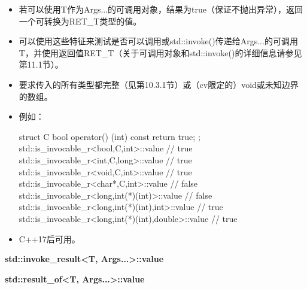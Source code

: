 \begin{itemize}
\item 
若可以使用T作为Args...的可调用对象，结果为true（保证不抛出异常），返回一个可转换为RET\_T类型的值。

\item 
可以使用这些特征来测试是否可以调用或std::invoke()传递给Args...的可调用T，并使用返回值RET\_T（关于可调用对象和std::invoke()的详细信息请参见第11.1节）。

\item 
要求传入的所有类型都完整（见第10.3.1节）或（cv限定的）void或未知边界的数组。

\item 
例如：
\begin{cpp}
struct C {
	bool operator() (int) const {
		return true;
	}
};
std::is_invocable_r<bool,C,int>::value // true
std::is_invocable_r<int,C,long>::value // true
std::is_invocable_r<void,C,int>::value // true
std::is_invocable_r<char*,C,int>::value // false
std::is_invocable_r<long,int(*)(int)>::value // false
std::is_invocable_r<long,int(*)(int),int>::value // true
std::is_invocable_r<long,int(*)(int),double>::value // true
\end{cpp}

\item 
C++17后可用。
\end{itemize}

\textbf{std::invoke\_result<T, Args...>::value}

\textbf{std::result\_of<T, Args...>::value}

